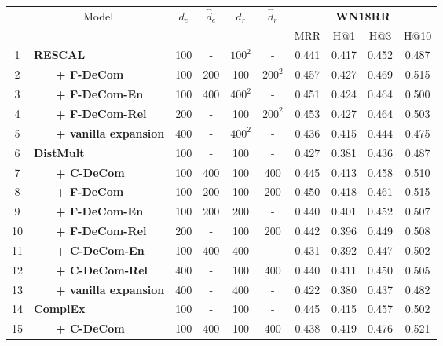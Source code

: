 \documentclass[letterpaper]{article} \usepackage{aaai20}  \usepackage{times}  \usepackage{helvet} \usepackage{courier}  \usepackage{booktabs}
\begin{document}
\begin{table*}[t]
    \centering
    \begin{tabular}{|c|l|cccc|cccc|}
    \toprule
        \bf\multirow{2}{*}{\#} & \multirow{2}{*}{~~~~~~~~~Model} & \multirow{2}{*}{$d_e$} &
        \multirow{2}{*}{$\hat{d}_e$} &
        \multirow{2}{*}{$d_r$} &
        \multirow{2}{*}{$\hat{d}_r$} &
        \multicolumn{4}{|c|}{\textbf{WN18RR}}   \\
        & & & & & &  MRR & H@1 & H@3&  H@10\\
         \midrule
         1 & \textbf{RESCAL} & 100 & - & $100^2$ & - & 0.441 & 0.417 & 0.452 & 0.487\\
         2 &~~~~\textbf{+ F-DeCom} & 100 & 200 & 100 & $200^2$ & 0.457 & 0.427 & 0.469 & 0.515\\
         3 &~~~~\textbf{+ F-DeCom-En} & 100 & 400 & $400^2$ & - & 0.451 & 0.424 & 0.464 & 0.500 \\
         4 & ~~~~\textbf{+ F-DeCom-Rel} & 200 & - & 100 & $200^2$ & 0.453 & 0.427 & 0.464 & 0.503 \\
         5 &~~~~\textbf{+ vanilla expansion} & 400 & - & $400^2$ & - & 0.436 & 0.415 & 0.444 & 0.475\\
         \midrule
         6 & \textbf{DistMult} & 100 & - & 100 & - & 0.427 & 0.381 & 0.436 & 0.487\\
         7 & ~~~~\textbf{+ C-DeCom}& 100 & 400 & 100 & 400 & 0.445 & 0.413 & 0.458 & 0.510\\
         8 & ~~~~\textbf{+ F-DeCom}& 100 & 200 & 100 & 200 & 0.450 & 0.418 & 0.461 & 0.515\\
         9 & ~~~~\textbf{+ F-DeCom-En} & 100 & 200 & 200 & - & 0.440 & 0.401 & 0.452 & 0.507\\
         10 & ~~~~\textbf{+ F-DeCom-Rel} & 200 & - & 100 & 200 & 0.442 & 0.396 & 0.449 & 0.508\\
         11 & ~~~~\textbf{+ C-DeCom-En} & 100 & 400 & 400 & - & 0.431 & 0.392 & 0.447 & 0.502\\
         12 & ~~~~\textbf{+ C-DeCom-Rel} & 400 & - & 100 & 400 & 0.440 & 0.411 & 0.450 & 0.505\\
         13 & ~~~~\textbf{+ vanilla expansion} & 400 & - & 400 & - & 0.422 & 0.380 & 0.437 & 0.482\\
         \midrule
         14 & \textbf{ComplEx} & 100 & - & 100 & - & 0.445 & 0.415 & 0.457 & 0.502\\
         15 &~~~~\textbf{+ C-DeCom} & 100 & 400 & 100 & 400 & 0.438 & 0.419 & 0.476 & 0.521\\

\end{tabular}
\end{table*}
\end{document}
